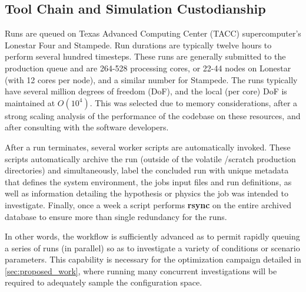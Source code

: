 \subsection{Tool Chain and Simulation Custodianship}

Runs are queued on Texas Advanced Computing Center (TACC)
supercomputer's Lonestar Four and Stampede. Run durations are typically  
twelve hours to perform several hundred timesteps. 
These runs are generally submitted to the production queue and are  
264-528 processing cores, 
or 22-44 nodes on Lonestar (with 12 cores per node), and a similar number
for Stampede. The runs typically have several million degrees of freedom (DoF), 
and the local (per core) DoF is maintained at $O(10^4)$. This was
selected due to memory considerations, after a strong scaling
analysis of the performance of the codebase on these resources, and
after consulting with the software developers.  

After a run terminates, several worker scripts are automatically invoked. 
These scripts automatically archive the run (outside of the volatile /scratch 
production directories) and simultaneously, label the concluded run with
unique metadata that defines the system environment, the jobs input
files and run definitions, as well as information detailing the
hypothesis or physics the job was intended to investigate. Finally, once
a week a script performs \textbf{rsync} on the entire archived database to
ensure more than single redundancy for the runs. 

In other words, the workflow is sufficiently advanced as to permit
rapidly queuing a series of runs (in parallel) so as to
investigate a variety of conditions or scenario parameters. This
capability is necessary for the optimization campaign detailed in
\ref{sec:proposed_work}, where running many concurrent investigations
will be required to adequately sample the configuration space. 
